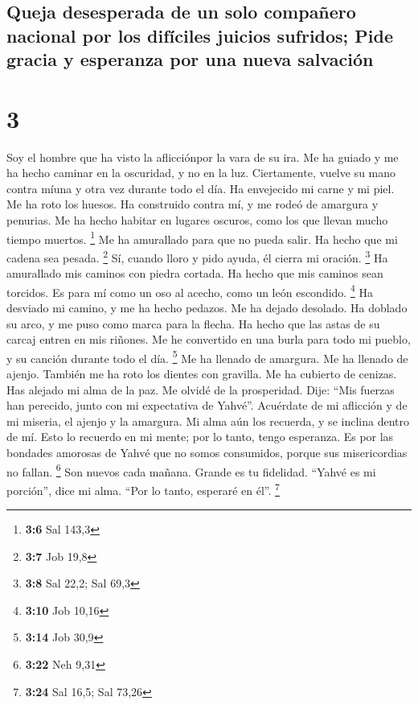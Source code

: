 \begin{paracol}{2}
{\subsection{Queja desesperada de un solo compañero nacional por los
difíciles juicios sufridos; Pide gracia y esperanza por una nueva
salvación}\label{queja-desesperada-de-un-solo-compauxf1ero-nacional-por-los-difuxedciles-juicios-sufridos-pide-gracia-y-esperanza-por-una-nueva-salvaciuxf3n}}

\hypertarget{section-4}{%
\section{3}\label{section-4}}

 Soy el hombre que ha visto la aflicciónpor la vara de su
ira.  Me ha guiado y me ha hecho caminar en la oscuridad,
y no en la luz.  Ciertamente, vuelve su mano contra míuna
y otra vez durante todo el día.  Ha envejecido mi carne y
mi piel. Me ha roto los huesos.  Ha construido contra mí,
y me rodeó de amargura y penurias.  Me ha hecho habitar en
lugares oscuros, como los que llevan mucho tiempo muertos. \footnote{\textbf{3:6}
  Sal 143,3}  Me ha amurallado para que no pueda salir. Ha
hecho que mi cadena sea pesada. \footnote{\textbf{3:7} Job 19,8}
 Sí, cuando lloro y pido ayuda, él cierra mi oración.
\footnote{\textbf{3:8} Sal 22,2; Sal 69,3}  Ha amurallado
mis caminos con piedra cortada. Ha hecho que mis caminos sean torcidos.
 Es para mí como un oso al acecho, como un león
escondido. \footnote{\textbf{3:10} Job 10,16}  Ha
desviado mi camino, y me ha hecho pedazos. Me ha dejado desolado.
 Ha doblado su arco, y me puso como marca para la flecha.
 Ha hecho que las astas de su carcaj entren en mis
riñones.  Me he convertido en una burla para todo mi
pueblo, y su canción durante todo el día. \footnote{\textbf{3:14} Job
  30,9}  Me ha llenado de amargura. Me ha llenado de
ajenjo.  También me ha roto los dientes con gravilla. Me
ha cubierto de cenizas.  Has alejado mi alma de la paz.
Me olvidé de la prosperidad.  Dije: ``Mis fuerzas han
perecido, junto con mi expectativa de Yahvé''.  Acuérdate
de mi aflicción y de mi miseria, el ajenjo y la amargura.
 Mi alma aún los recuerda, y se inclina dentro de mí.
 Esto lo recuerdo en mi mente; por lo tanto, tengo
esperanza.  Es por las bondades amorosas de Yahvé que no
somos consumidos, porque sus misericordias no fallan. \footnote{\textbf{3:22}
  Neh 9,31}  Son nuevos cada mañana. Grande es tu
fidelidad.  ``Yahvé es mi porción'', dice mi alma. ``Por
lo tanto, esperaré en él''. \footnote{\textbf{3:24} Sal 16,5; Sal 73,26}


\end{paracol}
